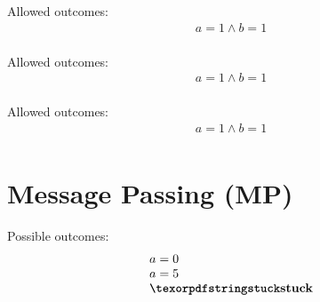 \begin{minipage}[t]{0.2\linewidth}
Allowed outcomes:\\
\[\begin{array}{l}
a = 1 \land b = 1 \\
\end{array}\]
\end{minipage}
%
\lbJoinTemplate{\rlx}{\rlx}{\rlx}{\rlx}
\litmusTestEnd

\begin{minipage}[t]{0.2\linewidth}
Allowed outcomes:\\
\[\begin{array}{l}
a = 1 \land b = 1 \\
\end{array}\]
\end{minipage}
%
\lbJoinTemplate{\rlx}{\rel}{\rlx}{\rel}
\litmusTestEnd

\begin{minipage}[t]{0.2\linewidth}
Allowed outcomes:\\
\[\begin{array}{l}
a = 1 \land b = 1 \\
\end{array}\]
\end{minipage}
%
\lbJoinTemplate{\acq}{\rlx}{\acq}{\rlx}
\litmusTestEnd

\section{Message Passing (MP)}
\label{app:mp}

\begin{minipage}[t]{0.3\linewidth}
Possible outcomes:\\
\[\begin{array}{l}
a = 0 \\
a = 5 \\
\kw{stuck} \\
\end{array}\]
\end{minipage}
%
\mpTemplate{\rlx}{\na}{\na}{\rlx}{\rlx}{\na}
\litmusTestEnd

